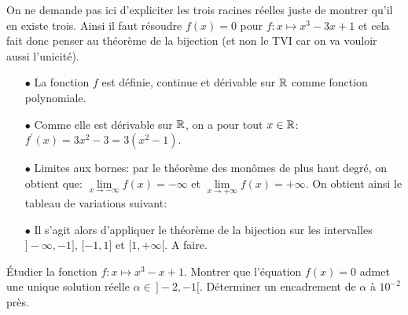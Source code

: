 \documentclass[a4paper, 11pt,reqno]{article}
\begin{document}
\begin{correction}  \;
	On ne demande pas ici d'expliciter les trois racines r\'eelles juste de montrer qu'il en existe trois. Ainsi il faut r\'esoudre $f(x)=0$ pour $f: x\mapsto x^3-3x+1$ et cela fait donc penser au th\'eor\`{e}me de la bijection (et non le TVI car on va vouloir aussi l'unicit\'e).
	\begin{itemize}
		\item[$\bullet$] La fonction $f$ est d\'efinie, continue et d\'erivable sur $\mathbb{R}$ comme fonction polynomiale.
		\item[$\bullet$] Comme elle est d\'erivable sur $\mathbb{R}$, on a pour tout $x\in\mathbb{R}$: $f^{\prime}(x)=3x^2-3=3(x^2-1)$.
		\item[$\bullet$] Limites aux bornes: par le th\'eor\`{e}me des mon\^{o}mes de plus haut degr\'e, on obtient que: $\lim\limits_{x\to -\infty} f(x)=-\infty$ et $\lim\limits_{x\to +\infty} f(x)=+\infty$.
		      On obtient ainsi le tableau de variations suivant:
		      \begin{center}
		      \end{center}
		\item[$\bullet$] Il s'agit alors d'appliquer le th\'eor\`{e}me de la bijection sur les intervalles $\rbrack -\infty,-1\rbrack$, $\lbrack -1,1\rbrack$ et $\lbrack 1,+\infty\lbrack$. A faire.
	\end{itemize}
\end{correction}
\begin{exercice}   \;
	\'Etudier la fonction $f: x\mapsto x^3-x+1$. Montrer que l'\'equation $f(x)=0$ admet une unique solution r\'eelle $\alpha\in \, \rbrack -2,-1\lbrack$. D\'eterminer un encadrement de $\alpha$ \`{a} $10^{-2}$ pr\`{e}s.
\end{exercice}
\end{document}
